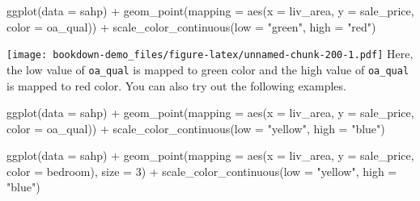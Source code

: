 \documentclass[
]{book}
\newenvironment{Shaded}{\begin{snugshade}}{\end{snugshade}}
\newcommand{\AttributeTok}[1]{\textcolor[rgb]{0.77,0.63,0.00}{#1}}
\newcommand{\DecValTok}[1]{\textcolor[rgb]{0.00,0.00,0.81}{#1}}
\newcommand{\FunctionTok}[1]{\textcolor[rgb]{0.00,0.00,0.00}{#1}}
\newcommand{\NormalTok}[1]{#1}
\newcommand{\SpecialCharTok}[1]{\textcolor[rgb]{0.00,0.00,0.00}{#1}}
\newcommand{\StringTok}[1]{\textcolor[rgb]{0.31,0.60,0.02}{#1}}
\begin{document}
\begin{Shaded}
\begin{Highlighting}[]
\FunctionTok{ggplot}\NormalTok{(}\AttributeTok{data =}\NormalTok{ sahp) }\SpecialCharTok{+} \FunctionTok{geom\_point}\NormalTok{(}\AttributeTok{mapping =} \FunctionTok{aes}\NormalTok{(}\AttributeTok{x =}\NormalTok{ liv\_area, }\AttributeTok{y =}\NormalTok{ sale\_price, }\AttributeTok{color =}\NormalTok{ oa\_qual)) }\SpecialCharTok{+} \FunctionTok{scale\_color\_continuous}\NormalTok{(}\AttributeTok{low =} \StringTok{"green"}\NormalTok{, }\AttributeTok{high =} \StringTok{"red"}\NormalTok{)}
\end{Highlighting}
\end{Shaded}

\texttt{[image: bookdown-demo\_files/figure-latex/unnamed-chunk-200-1.pdf]}
Here, the low value of \texttt{oa\_qual} is mapped to green color and the high value of \texttt{oa\_qual} is mapped to red color. You can also try out the following examples.

\begin{Shaded}
\begin{Highlighting}[]
\FunctionTok{ggplot}\NormalTok{(}\AttributeTok{data =}\NormalTok{ sahp) }\SpecialCharTok{+} \FunctionTok{geom\_point}\NormalTok{(}\AttributeTok{mapping =} \FunctionTok{aes}\NormalTok{(}\AttributeTok{x =}\NormalTok{ liv\_area, }\AttributeTok{y =}\NormalTok{ sale\_price, }\AttributeTok{color =}\NormalTok{ oa\_qual)) }\SpecialCharTok{+} \FunctionTok{scale\_color\_continuous}\NormalTok{(}\AttributeTok{low =} \StringTok{"yellow"}\NormalTok{, }\AttributeTok{high =} \StringTok{"blue"}\NormalTok{)}
\end{Highlighting}
\end{Shaded}

\begin{Shaded}
\begin{Highlighting}[]
\FunctionTok{ggplot}\NormalTok{(}\AttributeTok{data =}\NormalTok{ sahp) }\SpecialCharTok{+} \FunctionTok{geom\_point}\NormalTok{(}\AttributeTok{mapping =} \FunctionTok{aes}\NormalTok{(}\AttributeTok{x =}\NormalTok{ liv\_area, }\AttributeTok{y =}\NormalTok{ sale\_price, }\AttributeTok{color =}\NormalTok{ bedroom), }\AttributeTok{size =} \DecValTok{3}\NormalTok{) }\SpecialCharTok{+} \FunctionTok{scale\_color\_continuous}\NormalTok{(}\AttributeTok{low =} \StringTok{"yellow"}\NormalTok{, }\AttributeTok{high =} \StringTok{"blue"}\NormalTok{)}
\end{Highlighting}
\end{Shaded}
\end{document}
